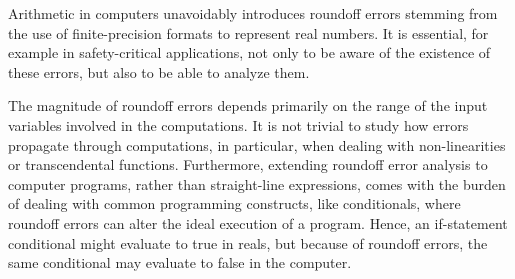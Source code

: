 %

Arithmetic in computers unavoidably introduces roundoff errors stemming from the use of finite-precision formats to represent real numbers.
%
It is essential, for example in safety-critical applications, not only to be aware of the existence of these errors, but also to be able to analyze them.

%
%
%

%
The magnitude of roundoff errors depends primarily on the range of the input variables involved in the computations.
%
It is not trivial to study how errors propagate through computations, in particular, when dealing with non-linearities or transcendental functions.
%
Furthermore, extending roundoff error analysis to computer programs, rather than straight-line expressions, comes with the burden of dealing with common programming constructs, like conditionals, where roundoff errors can alter the ideal execution of a program. 
%
Hence, an if-statement conditional might evaluate to true in reals, but because of roundoff errors, the same conditional may evaluate to false in the computer. 
%
%
%
%
%

